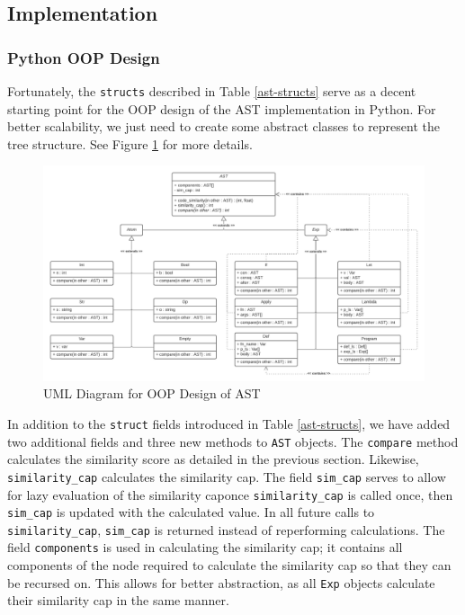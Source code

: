 \documentclass[12pt]{article}
\newcommand{\key}[1]{\texttt{#1}}
\begin{document}
\subsection{Implementation}
\subsubsection{Python OOP Design}
Fortunately, the \key{structs} described in Table \ref{ast-structs} serve as a decent starting point for the OOP design of the AST implementation in Python. For better scalability, we just need to create some abstract classes to represent the tree structure. See Figure \ref{oop-uml} for more details.
\begin{figure}[H]
  \begin{mdframed}
    \centering
    \includegraphics[scale=.45]{oop_uml}
  \end{mdframed}
  \caption{UML Diagram for OOP Design of AST}
  \label{oop-uml}
\end{figure}

In addition to the \key{struct} fields introduced in Table \ref{ast-structs}, we have added two additional fields and three new methods to \key{AST} objects. The \key{compare} method calculates the similarity score as detailed in the previous section. Likewise, \key{similarity\_cap} calculates the similarity cap. The field \key{sim\_cap} serves to allow for lazy evaluation of the similarity cap\textemdash once \key{similarity\_cap} is called once, then \key{sim\_cap} is updated with the calculated value. In all future calls to \key{similarity\_cap}, \key{sim\_cap} is returned instead of reperforming calculations. The field \key{components} is used in calculating the similarity cap; it contains all components of the node required to calculate the similarity cap so that they can be recursed on. This allows for better abstraction, as all \key{Exp} objects calculate their similarity cap in the same manner.
\end{document}
